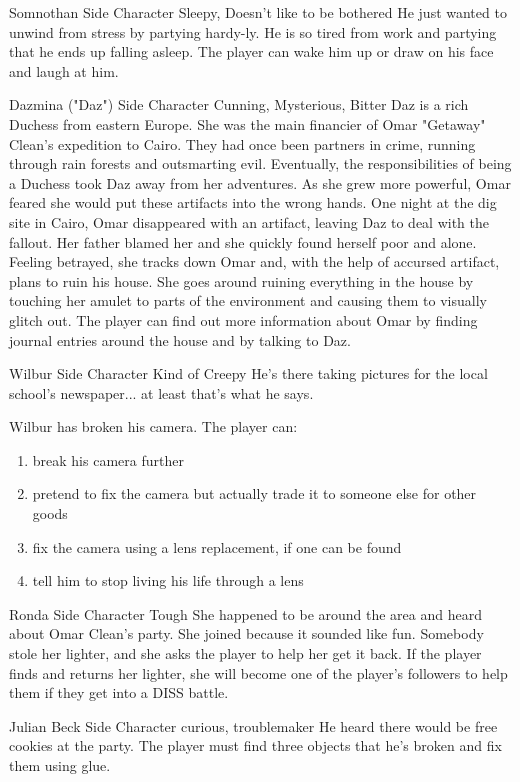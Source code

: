 {Somnothan}
{Side Character}
{Sleepy, Doesn't like to be bothered}
{He just wanted to unwind from stress by partying hardy-ly. }
{He is so tired from work and partying that he ends up falling asleep. The player can wake him up or draw on his face and laugh at him.}

{Dazmina ("Daz")}
{Side Character}
{Cunning, Mysterious, Bitter}
{Daz is a rich Duchess from eastern Europe. She was the main financier of Omar "Getaway" Clean's expedition to Cairo. They had once been partners in crime, running through rain forests and outsmarting evil. Eventually, the responsibilities of being a Duchess took Daz away from her adventures. As she grew more powerful, Omar feared she would put these artifacts into the wrong hands. One night at the dig site in Cairo, Omar disappeared with an artifact, leaving Daz to deal with the fallout. Her father blamed her and she quickly found herself poor and alone. Feeling betrayed, she tracks down Omar and, with the help of accursed artifact, plans to ruin his house.}
{She goes around ruining everything in the house by touching her amulet to parts of the environment and causing them to visually glitch out. The player can find out more information about Omar by finding journal entries around the house and by talking to Daz.}

{Wilbur}
{Side Character}
{Kind of Creepy}
{He's there taking pictures for the local school's newspaper... at least that's what he says.}
{Wilbur has broken his camera. The player can:
\begin{enumerate}
\item{break his camera further}
\item{pretend to fix the camera but actually trade it to someone else for other goods}
\item{fix the camera using a lens replacement, if one can be found}
\item{tell him to stop living his life through a lens}
\end{enumerate}
}

{Ronda}
{Side Character}
{Tough}
{She happened to be around the area and heard about Omar Clean's party. She joined because it sounded like fun.}
{Somebody stole her lighter, and she asks the player to help her get it back. If the player finds and returns her lighter, she will become one of the player's followers to help them if they get into a DISS battle.
}

{Julian Beck}
{Side Character}
{curious, troublemaker}
{He heard there would be free cookies at the party.}
{The player must find three objects that he's broken and fix them using glue.}

